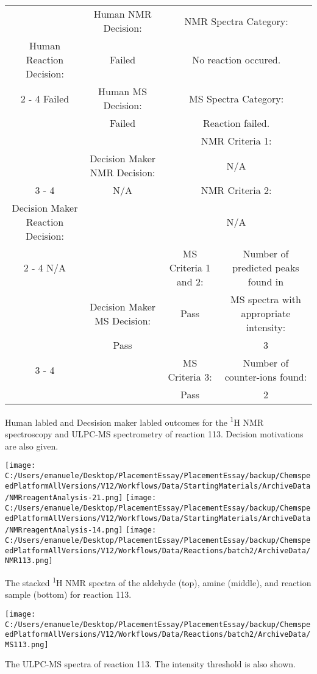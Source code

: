 \documentclass{article}%
\begin{document}
\begin{Decision Table}[H]%
\begin{tabular}{|c|c|c|c|}%
\hline%
&Human NMR Decision:&\multicolumn{2}{|c|}{NMR Spectra Category:}\\%
Human Reaction Decision:&Failed&\multicolumn{2}{|c|}{No reaction occured.}\\%
\cline{2%
-%
4}%
Failed&Human MS Decision:&\multicolumn{2}{|c|}{MS Spectra Category:}\\%
&Failed&\multicolumn{2}{|c|}{Reaction failed.}\\%
\hline%
&&\multicolumn{2}{|c|}{NMR Criteria 1:}\\%
&Decision Maker NMR Decision:&\multicolumn{2}{|c|}{N/A}\\%
\cline{3%
-%
4}%
&N/A&\multicolumn{2}{|c|}{NMR Criteria 2:}\\%
Decision Maker Reaction Decision:&&\multicolumn{2}{|c|}{N/A}\\%
\cline{2%
-%
4}%
N/A&&MS Criteria 1 and 2:&Number of predicted peaks found in\\%
&Decision Maker MS Decision:&Pass&MS spectra with appropriate intensity:\\%
&Pass&&3\\%
\cline{3%
-%
4}%
&&MS Criteria 3:&Number of counter{-}ions found:\\%
&&Pass&2\\%
\hline%
\end{tabular}%
\caption{Human labled and Decsision maker labled outcomes for the \textsuperscript{1}H NMR spectroscopy and ULPC-MS spectrometry of reaction 113. Decision motivations are also given.}%
\end{Decision Table}%
\begin{NMR Spectra}[H]%
\begin{center}%
\texttt{[image: C:/Users/emanuele/Desktop/PlacementEssay/PlacementEssay/backup/ChemspeedPlatformAllVersions/V12/Workflows/Data/StartingMaterials/ArchiveData/NMRreagentAnalysis-21.png]}\hfill%
\texttt{[image: C:/Users/emanuele/Desktop/PlacementEssay/PlacementEssay/backup/ChemspeedPlatformAllVersions/V12/Workflows/Data/StartingMaterials/ArchiveData/NMRreagentAnalysis-14.png]}\hfill%
\texttt{[image: C:/Users/emanuele/Desktop/PlacementEssay/PlacementEssay/backup/ChemspeedPlatformAllVersions/V12/Workflows/Data/Reactions/batch2/ArchiveData/NMR113.png]}\hfill%
\end{center}%
\caption{The stacked \textsuperscript{1}H NMR spectra of the aldehyde (top), amine (middle), and reaction sample (bottom) for reaction 113.}%
\end{NMR Spectra}%
\begin{MS Spectra}[H]%
\begin{center}%
\texttt{[image: C:/Users/emanuele/Desktop/PlacementEssay/PlacementEssay/backup/ChemspeedPlatformAllVersions/V12/Workflows/Data/Reactions/batch2/ArchiveData/MS113.png]}\hfill%
\end{center}%
\caption{The ULPC-MS spectra of reaction 113. The intensity threshold is also shown.}%
\end{MS Spectra}%
\end{document}
